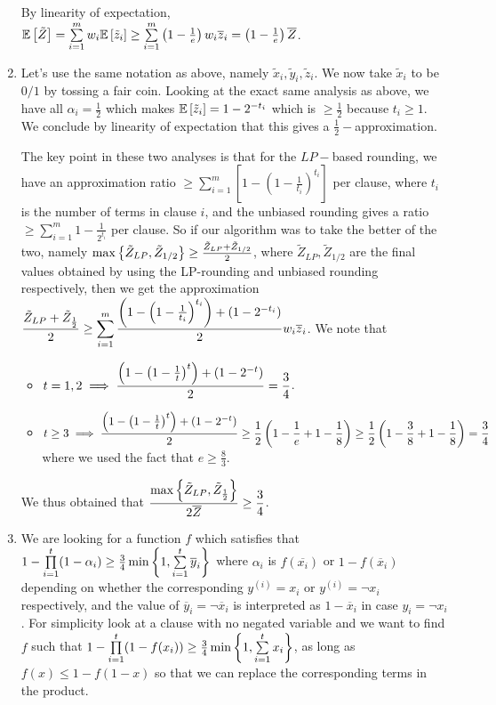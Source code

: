 \begin{enumerate}[label=(\alph*)]
By linearity of expectation, $\mathbb E\left[ \tilde Z \right] = \sum\limits_{i=1}^{m}w_{i}\mathbb E\left[ \tilde z_{i} \right] \ge \sum\limits_{i=1}^{m}\left(1-\frac1e\right)w_{i}\overline z_{i} = \left(1-\frac1e\right)\overline Z$.

\item Let's use the same notation as above, namely $\tilde x_{i},\tilde y_{i},\tilde z_{i}$. We now take $\tilde x_{i}$ to be $0/1$ by tossing a fair coin. Looking at the exact same analysis as above, we have all $\alpha_{i} = \frac12$ which makes $\mathbb E\left[ \tilde z_{i} \right] = 1-2^{-t_{i}}$ which is $\ge \frac12$ because $t_{i}\ge 1$. We conclude by linearity of expectation that this gives a $\frac12-$approximation.

The key point in these two analyses is that for the $LP-$based rounding, we have an approximation ratio $\ge \sum\limits_{i=1}^{m} \left[1- \left(1-\frac{1}{t_{i}}\right)^{t_{i}}\right]$ per clause, where $t_{i}$ is the number of terms in clause $i$, and the unbiased rounding gives a ratio $\ge \sum\limits_{i=1}^{m} 1-\frac{1}{2^{t_{i}}}$ per clause. So if our algorithm was to take the better of the two, namely $\max\left\{\tilde Z_{LP}, \tilde Z_{1/2}\right\} \ge \frac{\tilde Z_{LP}+ \tilde Z_{1/2}}2$, where $\tilde Z_{LP},\tilde Z_{1/2}$ are the final values obtained by using the LP-rounding and unbiased rounding respectively, then we get the approximation $\displaystyle\frac{\tilde Z_{LP}+ \tilde Z_{\frac12}}2\ge \sum\limits_{i=1}^{m} \frac{\left(1- \left(1-\frac{1}{t_{i}}\right)^{t_{i}}\right)+\left(1-2^{-t_{i}}\right)}{2}w_{i}\overline z_{i}$.
We note that 
\begin{itemize}[leftmargin=*]
\item $\displaystyle t=1,2\implies \frac{\left(1- \left(1-\frac{1}{t}\right)^{t}\right)+\left(1-2^{-t}\right)}{2} = \frac34$.
\item $\displaystyle t\ge 3\implies \frac{\left(1- \left(1-\frac{1}{t}\right)^{t}\right)+\left(1-2^{-t}\right)}{2} \ge \frac12\left(1-\frac1e+1-\frac18\right) \ge \frac12\left(1-\frac38+1-\frac18\right)=\frac34$ where we used the fact that $e\ge \frac83$.
\end{itemize}
We thus obtained that $\displaystyle\frac{\max\left\{\tilde Z_{LP}, \tilde Z_{\frac12}\right\}}{2\overline Z} \ge \frac34$.
\item We are looking for a function $f$ which satisfies that $1-\prod\limits_{i=1}^{t} (1-\alpha_{i}) \ge \frac34 \min\left\{1,\sum\limits_{i=1}^{t}\overline y_{i}\right\}$ where $\alpha_{i}$ is $f(\overline{x_{i}})$ or $1-f(\overline x_{i})$ depending on whether the corresponding $y^{(i)}=x_{i}$ or $y^{(i)}=\neg x_{i}$ respectively, and the value of $\overline y_{i} = \neg \overline x_{i}$ is interpreted as $1-\overline x_{i}$ in case $y_{i} = \neg x_{i}$. For simplicity look at a clause with no negated variable and we want to find $f$ such that $1-\prod\limits_{i=1}^{t} (1-f(x_{i})) \ge \frac34 \min\left\{1,\sum\limits_{i=1}^{t}x_{i}\right\}$, as long as $f(x) \le 1-f(1-x)$ so that we can replace the corresponding terms in the product. 


\end{enumerate}
